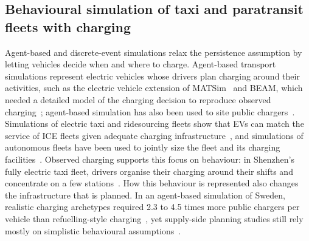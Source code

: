 \documentclass{elsarticle}
\begin{document}
\subsection{Behavioural simulation of taxi and paratransit fleets with charging}
\label{sec:rw_abm}
Agent-based and discrete-event simulations relax the persistence assumption by letting vehicles decide when and where to charge. Agent-based transport simulations represent electric vehicles whose drivers plan charging around their activities, such as the electric vehicle extension of MATSim~\cite{waraich2013_phev_smart_grids, horni2016_matsim} and BEAM, which needed a detailed model of the charging decision to reproduce observed charging~\cite{sheppard2017_beam}; agent-based simulation has also been used to site public chargers~\cite{sheppard2016_charging_siting_abm}. Simulations of electric taxi and ridesourcing fleets show that EVs can match the service of ICE fleets given adequate charging infrastructure~\cite{bischoff2014_etaxi_abm, bauer2019_ridesourcing_electrification}, and simulations of autonomous fleets have been used to jointly size the fleet and its charging facilities~\cite{chen2016_saev_fleet_charging, yang2023_eamod_fleet_charging_design}. Observed charging supports this focus on behaviour: in Shenzhen's fully electric taxi fleet, drivers organise their charging around their shifts and concentrate on a few stations~\cite{lei2022_etaxi_charging_dynamics}. How this behaviour is represented also changes the infrastructure that is planned. In an agent-based simulation of Sweden, realistic charging archetypes required 2.3 to 4.5 times more public chargers per vehicle than refuelling-style charging~\cite{liao2023_charging_behaviour_infra_needs}, yet supply-side planning studies still rely mostly on simplistic behavioural assumptions~\cite{patil2023_charging_behaviour_infra_review, vanderkam2019_abm_charging_behaviour}.

\end{document}
